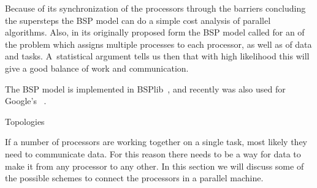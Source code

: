 Because of its synchronization of the processors through the barriers
concluding the supersteps the \ac{BSP} model can do a simple cost
analysis of parallel algorithms. Also, in its originally proposed form
the \ac{BSP} model called for an  of the
problem which assigns multiple processes to each processor, as well as
 of data and tasks. A~statistical argument
tells us then that with high likelihood this will give a good balance
of work and communication.

The \ac{BSP} model is implemented in BSPlib~\cite{BSPlib}, and
recently was also used for Google's
~\cite{Pregel:podc2009}.

 {Topologies}

If a number of processors are working together on a single task, most
likely they need to communicate data. For this reason there needs to
be a way for data to make it from any processor to any other. In this
section we will discuss some of the possible schemes to connect the
processors in a parallel machine.

